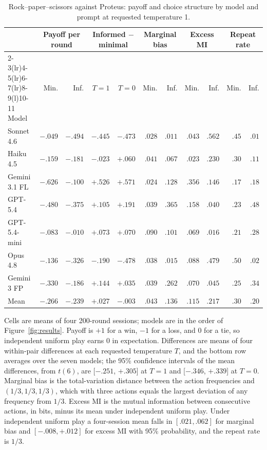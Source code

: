 \begin{table}[htbp]
\centering
\caption{Rock--paper--scissors against Proteus: payoff and choice structure by model and prompt at requested temperature 1.}
\label{tab:rps}
\footnotesize
\setlength{\tabcolsep}{3.6pt}
\begin{tabular}{@{}lrrrrrrrrrr@{}}
\toprule
 & \multicolumn{2}{c}{Payoff per round} & \multicolumn{2}{c}{Informed $-$ minimal} & \multicolumn{2}{c}{Marginal bias} & \multicolumn{2}{c}{Excess MI} & \multicolumn{2}{c}{Repeat rate} \\
\cmidrule(lr){2-3}\cmidrule(lr){4-5}\cmidrule(lr){6-7}\cmidrule(lr){8-9}\cmidrule(l){10-11}
Model & Min. & Inf. & $T=1$ & $T=0$ & Min. & Inf. & Min. & Inf. & Min. & Inf. \\
\midrule
Sonnet 4.6 & $-.049$ & $-.494$ & $-.445$ & $-.473$ & $.028$ & $.011$ & $.043$ & $.562$ & $.45$ & $.01$ \\
Haiku 4.5 & $-.159$ & $-.181$ & $-.023$ & $+.060$ & $.041$ & $.067$ & $.023$ & $.230$ & $.30$ & $.11$ \\
Gemini 3.1 FL & $-.626$ & $-.100$ & $+.526$ & $+.571$ & $.024$ & $.128$ & $.356$ & $.146$ & $.17$ & $.18$ \\
GPT-5.4 & $-.480$ & $-.375$ & $+.105$ & $+.191$ & $.039$ & $.365$ & $.158$ & $.040$ & $.23$ & $.48$ \\
GPT-5.4-mini & $-.083$ & $-.010$ & $+.073$ & $+.070$ & $.090$ & $.101$ & $.069$ & $.016$ & $.21$ & $.28$ \\
Opus 4.8 & $-.136$ & $-.326$ & $-.190$ & $-.478$ & $.038$ & $.015$ & $.088$ & $.479$ & $.50$ & $.02$ \\
Gemini 3 FP & $-.330$ & $-.186$ & $+.144$ & $+.035$ & $.039$ & $.262$ & $.070$ & $.045$ & $.25$ & $.34$ \\
\midrule
Mean & $-.266$ & $-.239$ & $+.027$ & $-.003$ & $.043$ & $.136$ & $.115$ & $.217$ & $.30$ & $.20$ \\
\bottomrule
\end{tabular}
\par\smallskip\begin{minipage}{\linewidth}\footnotesize Cells are means of four 200-round sessions; models are in the order of Figure~\ref{fig:results}. Payoff is $+1$ for a win, $-1$ for a loss, and $0$ for a tie, so independent uniform play earns 0 in expectation. Differences are means of four within-pair differences at each requested temperature $T$, and the bottom row averages over the seven models; the 95\% confidence intervals of the mean differences, from $t(6)$, are [$-.251$, $+.305$] at $T=1$ and [$-.346$, $+.339$] at $T=0$. Marginal bias is the total-variation distance between the action frequencies and $(1/3, 1/3, 1/3)$, which with three actions equals the largest deviation of any frequency from $1/3$. Excess MI is the mutual information between consecutive actions, in bits, minus its mean under independent uniform play. Under independent uniform play a four-session mean falls in $[.021, .062]$ for marginal bias and $[-.008, +.012]$ for excess MI with 95\% probability, and the repeat rate is $1/3$.\end{minipage}
\end{table}
